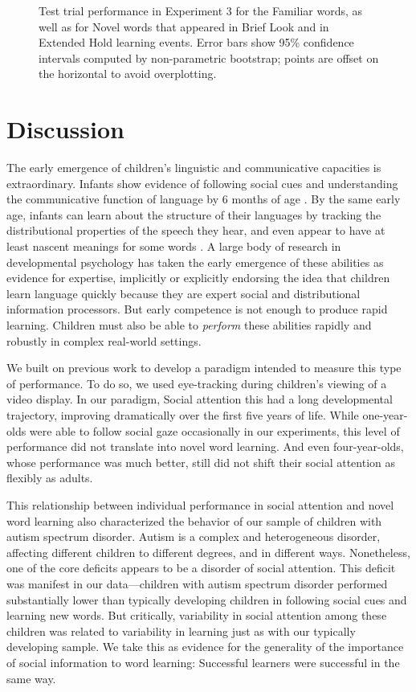 \documentclass[man,floatsintext]{apa6}
\begin{document}
\begin{figure}[tb]
	\caption{\label{fig:soc_word_test}Test trial performance in Experiment 3 for the Familiar words, as well as for Novel words that appeared in Brief Look and in Extended Hold learning events. Error bars show 95\% confidence intervals computed by non-parametric bootstrap; points are offset on the horizontal to avoid overplotting.}
\end{figure}


\section{Discussion}

The early emergence of children's linguistic and communicative capacities is extraordinary. Infants show evidence of following social cues and understanding the communicative function of language by 6 months of age \cite{senju2008, vouloumanos2014}. By the same early age, infants can learn about the structure of their languages by tracking the distributional properties of the speech they hear, and even appear to have at least nascent meanings for some words \cite{thiessen2003, bergelson2012}. A large body of research in developmental psychology has taken the early emergence of these abilities as evidence for expertise, implicitly or explicitly endorsing the idea that children learn language quickly because they are expert social and distributional information processors. But early competence is not enough to produce rapid learning. Children must also be able to \emph{perform} these abilities rapidly and robustly in complex real-world settings.

We built on previous work to develop a paradigm intended to measure this type of performance. To do so, we used eye-tracking during children’s viewing of a video display. In our paradigm,
Social attention this had a long developmental trajectory, improving dramatically over the first five years of life. While one-year-olds were able to follow social gaze occasionally in our experiments, this level of performance did not translate into novel word learning. And even four-year-olds, whose performance was much better, still did not shift their social attention as flexibly as adults.

This relationship between individual performance in social attention and novel word learning also characterized the behavior of our sample of children with autism spectrum disorder. Autism is a complex and heterogeneous disorder, affecting different children to different degrees, and in different ways. Nonetheless, one of the core deficits appears to be a disorder of social attention. This deficit was manifest in our data---children with autism spectrum disorder performed substantially lower than typically developing children in following social cues and learning new words. But critically, variability in social attention among these children was related to variability in learning just as with our typically developing sample.  We take this as evidence for the generality of the importance of social information to word learning: Successful learners were successful in the same way.
\end{document}
